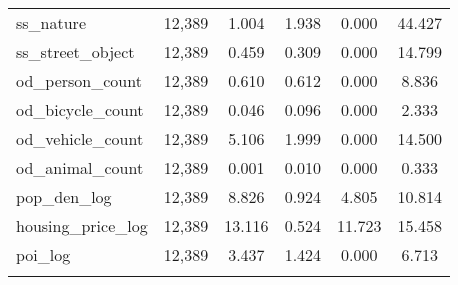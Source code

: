 \begin{table}[!htbp]
\begin{tabular}{@{\extracolsep{5pt}}lccccc}
ss\_nature & 12,389 & 1.004 & 1.938 & 0.000 & 44.427 \\ 
ss\_street\_object & 12,389 & 0.459 & 0.309 & 0.000 & 14.799 \\ 
od\_person\_count & 12,389 & 0.610 & 0.612 & 0.000 & 8.836 \\ 
od\_bicycle\_count & 12,389 & 0.046 & 0.096 & 0.000 & 2.333 \\ 
od\_vehicle\_count & 12,389 & 5.106 & 1.999 & 0.000 & 14.500 \\ 
od\_animal\_count & 12,389 & 0.001 & 0.010 & 0.000 & 0.333 \\ 
pop\_den\_log & 12,389 & 8.826 & 0.924 & 4.805 & 10.814 \\ 
housing\_price\_log & 12,389 & 13.116 & 0.524 & 11.723 & 15.458 \\ 
poi\_log & 12,389 & 3.437 & 1.424 & 0.000 & 6.713 \\ 
\hline \\[-1.8ex] 
\end{tabular} 
\end{table} 
